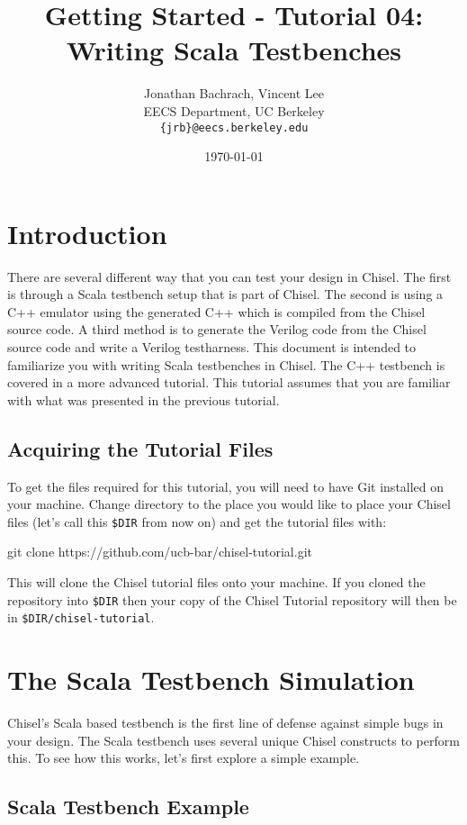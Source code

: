 \documentclass[twocolumn, 10pt]{article}
\title{Getting Started - Tutorial 04: Writing Scala Testbenches}
\author{Jonathan Bachrach, Vincent Lee \\
EECS Department, UC Berkeley\\
{\tt  \{jrb\}@eecs.berkeley.edu}
}
\date{\today}
\begin{document}
\maketitle{}

\section{Introduction}

There are several different way that you can test your design in Chisel. The first is through a Scala testbench setup that is part of Chisel. The second is using a C++ emulator using the generated C++ which is compiled from the Chisel source code. A third method is to generate the Verilog code from the Chisel source code and write a Verilog testharness. This document is intended to familiarize you with writing Scala testbenches in Chisel. The C++ testbench is covered in a more advanced tutorial.  This tutorial assumes that you are familiar with what was presented in the previous tutorial.

\subsection{Acquiring the Tutorial Files}

To get the files required for this tutorial, you will need to have Git installed on your machine. Change directory to the place you would like to place your Chisel files (let's call this \verb+$DIR+ from now on) and get the tutorial files with:

\begin{bash}
git clone https://github.com/ucb-bar/chisel-tutorial.git
\end{bash}

This will clone the Chisel tutorial files onto your machine. If you cloned the repository into \verb+$DIR+ then your copy of the Chisel Tutorial repository will then be in \verb+$DIR/chisel-tutorial+.

\section{The Scala Testbench Simulation}

Chisel's Scala based testbench is the first line of defense against simple bugs in your design. The Scala testbench uses several unique Chisel constructs to perform this. To see how this works, let's first explore a simple example.

\subsection{Scala Testbench Example}
\end{document}
